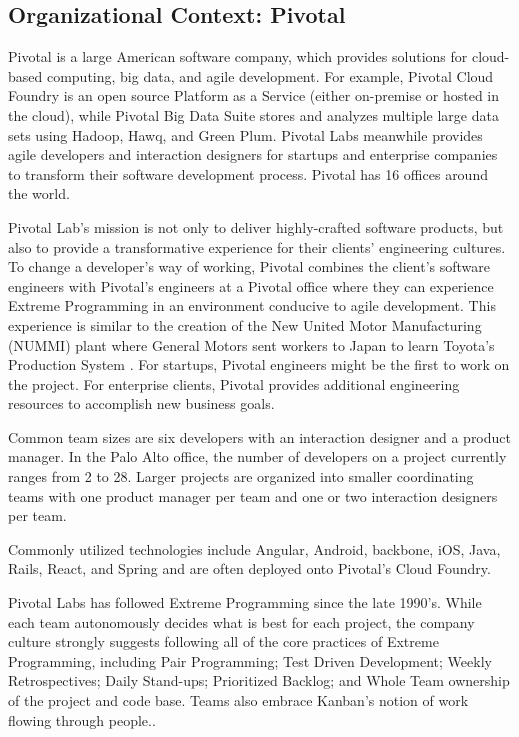\subsection{Organizational Context: Pivotal}
Pivotal is a large American software company, which provides solutions for cloud-based computing, big data, and agile development. For example, Pivotal Cloud Foundry is an open source Platform as a Service (either on-premise or hosted in the cloud), while Pivotal Big Data Suite stores and analyzes multiple large data sets using Hadoop, Hawq, and Green Plum. Pivotal Labs meanwhile provides agile developers and interaction designers for startups and enterprise companies to transform their software development process. Pivotal has 16 offices around the world. 

Pivotal Lab's mission is not only to deliver highly-crafted software products, but also to provide a transformative experience for their clients' engineering cultures. To change a developer's way of working, Pivotal combines the client's software engineers with Pivotal's engineers at a Pivotal office where they can experience Extreme Programming in an environment conducive to agile development. This experience is similar to the creation of the New United Motor Manufacturing (NUMMI) plant where General Motors sent workers to Japan to learn Toyota's Production System \cite{Nummi}. For startups, Pivotal engineers might be the first to work on the project. For enterprise clients, Pivotal provides additional engineering resources to accomplish new business goals. 

Common team sizes are six developers with an interaction designer and a product manager. In the Palo Alto office, the number of developers on a project currently ranges from 2 to 28. Larger projects are organized into smaller coordinating teams with one product manager per team and one or two interaction designers per team. 

Commonly utilized technologies include Angular, Android, backbone, iOS, Java, Rails, React, and Spring and are often deployed onto Pivotal's Cloud Foundry. 

Pivotal Labs has followed Extreme Programming \cite{ExtremeProgramming2004} since the late 1990's. While each team autonomously decides what is best for each project, the company culture strongly suggests following all of the core practices of Extreme Programming, including Pair Programming; Test Driven Development; Weekly Retrospectives; Daily Stand-ups; Prioritized Backlog; and Whole Team ownership of the project and code base. Teams also embrace Kanban's notion of work flowing through people..

